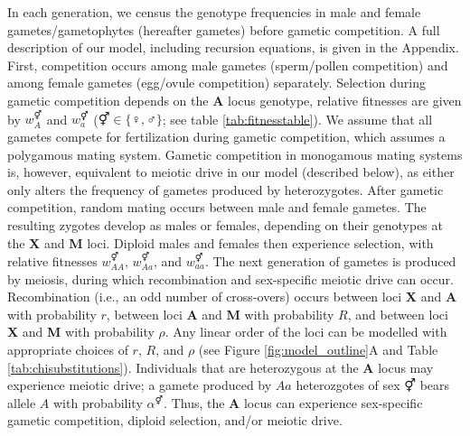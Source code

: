 \documentclass[10pt,letterpaper]{article}
\begin{document}
In each generation, we census the genotype frequencies in male and female gametes/gametophytes (hereafter gametes) before gametic competition. 
A full description of our model, including recursion equations, is given in the Appendix. 
First, competition occurs among male gametes (sperm/pollen competition) and among female gametes (egg/ovule competition) separately. 
Selection during gametic competition depends on the \textbf{A} locus genotype, relative fitnesses are given by $w_A^\Hermaphrodite$ and $w_a^\Hermaphrodite$ ($\Hermaphrodite \in \{\female,\male\}$; see table \ref{tab:fitnesstable}). %
We assume that all gametes compete for fertilization during gametic competition, which assumes a polygamous mating system. 
Gametic competition in monogamous mating systems is, however, equivalent to meiotic drive in our model (described below), as either only alters the frequency of gametes produced by heterozygotes. 
After gametic competition, random mating occurs between male and female gametes.
The resulting zygotes develop as males or females, depending on their genotypes at the \textbf{X} and \textbf{M} loci. %
Diploid males and females then experience selection, with relative fitnesses $w_{AA}^{\Hermaphrodite}$, $w_{Aa}^{\Hermaphrodite}$, and $w_{aa}^{\Hermaphrodite}$. %
The next generation of gametes is produced by meiosis, during which recombination and sex-specific meiotic drive can occur. 
Recombination (i.e., an odd number of cross-overs) occurs between loci \textbf{X} and \textbf{A} with probability $r$, between loci \textbf{A} and \textbf{M} with probability $R$, and between loci \textbf{X} and \textbf{M} with probability $\rho$.
Any linear order of the loci can be modelled with appropriate choices of $r$, $R$, and $\rho$ (see Figure \ref{fig:model_outline}A and Table \ref{tab:chisubstitutions}). 
Individuals that are heterozygous at the \textbf{A} locus may experience meiotic drive; a gamete produced by $Aa$ heterozgotes of sex $\Hermaphrodite$ bears allele $A$ with probability $\alpha^\Hermaphrodite$. 
Thus, the \textbf{A} locus can experience sex-specific gametic competition, diploid selection, and/or meiotic drive. 
\end{document}
